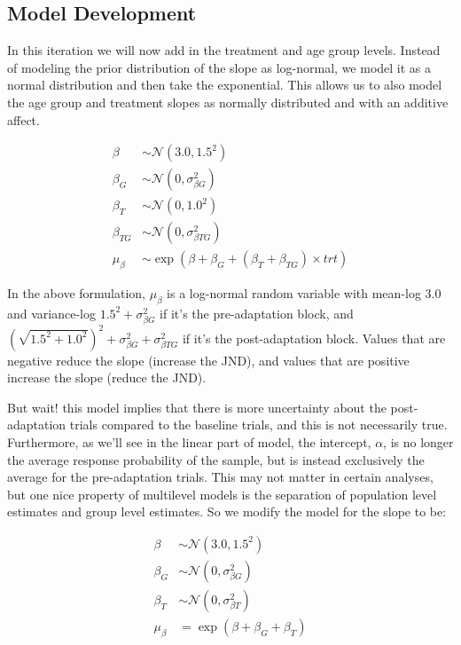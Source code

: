 \documentclass[11pt, oneside, openany]{scrbook}
\begin{document}
\hypertarget{mod-dev-iter2}{%
\subsection{Model Development}\label{mod-dev-iter2}}

In this iteration we will now add in the treatment and age group levels. Instead of modeling the prior distribution of the slope as log-normal, we model it as a normal distribution and then take the exponential. This allows us to also model the age group and treatment slopes as normally distributed and with an additive affect.

\begin{align*}
\beta &\sim \mathcal{N}(3.0, 1.5^2) \\
\beta_G &\sim \mathcal{N}(0, \sigma_{\beta G}^2) \\
\beta_T &\sim \mathcal{N}(0, 1.0^2) \\
\beta_{TG} &\sim \mathcal{N}(0, \sigma_{\beta TG}^2) \\
\mu_\beta &\sim \exp(\beta + \beta_G + (\beta_T + \beta_{TG})\times trt)
\end{align*}

In the above formulation, \(\mu_\beta\) is a log-normal random variable with mean-log \(3.0\) and variance-log \(1.5^2 + \sigma_{\beta G}^2\) if it's the pre-adaptation block, and \(\left(\sqrt{1.5^2 + 1.0^2}\right)^2 + \sigma_{\beta G}^2 + \sigma_{\beta TG}^2\) if it's the post-adaptation block. Values that are negative reduce the slope (increase the JND), and values that are positive increase the slope (reduce the JND).

But wait! this model implies that there is more uncertainty about the post-adaptation trials compared to the baseline trials, and this is not necessarily true. Furthermore, as we'll see in the linear part of model, the intercept, \(\alpha\), is no longer the average response probability of the sample, but is instead exclusively the average for the pre-adaptation trials. This may not matter in certain analyses, but one nice property of multilevel models is the separation of population level estimates and group level estimates. So we modify the model for the slope to be:

\begin{align*}
\beta &\sim \mathcal{N}(3.0, 1.5^2) \\
\beta_G &\sim \mathcal{N}(0, \sigma_{\beta G}^2) \\
\beta_T &\sim \mathcal{N}(0, \sigma_{\beta T}^2) \\
\mu_\beta &= \exp(\beta + \beta_G + \beta_T)
\end{align*}
\end{document}
